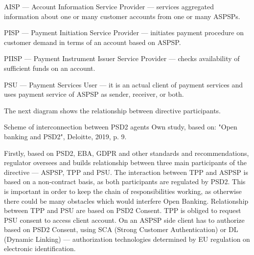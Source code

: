 AISP — Account Information Service Provider — services aggregated information about one or many customer accounts from one or many ASPSPs.

PISP — Payment Initiation Service Provider — initiates payment procedure on customer demand in terms of an account based on ASPSP.

PIISP — Payment Instrument Issuer Service Provider — checks availability of sufficient funds on an account.

PSU — Payment Services User — it is an actual client of payment services and uses payment service of ASPSP as sender, receiver, or both.

The next diagram shows the relationship between directive participants.

\mttable
{Scheme of interconnection between PSD2 agents}
{Own study, based on: "Open banking and PSD2", Deloitte, 2019, p. 9.}
{
}

Firstly, based on PSD2, EBA, GDPR and other standards and recommendations, regulator oversees and builds relationship between three main participants of the directive — ASPSP, TPP and PSU.
The interaction between TPP and ASPSP is based on a non-contract basis, as both participants are regulated by PSD2.
This is important in order to keep the chain of responsibilities working, as otherwise there could be many obstacles which would interfere Open Banking.
Relationship between TPP and PSU are based on PSD2 Consent.
TPP is obliged to request PSU consent to access client account.
On an ASPSP side client has to authorize based on PSD2 Consent, using SCA (Strong Customer Authentication) or DL (Dynamic Linking) — authorization technologies determined by EU regulation on electronic identification.

